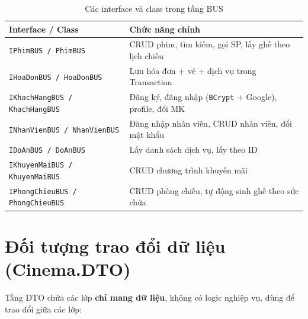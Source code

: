 \documentclass[12pt,a4paper,oneside]{book}
\theoremstyle{plain}
\numberwithin{equation}{chapter}
\begin{document}
\begin{table}[H]
    \begin{center}
        \begin{tabular}{|l|l|}
            \hline
            \textbf{Interface / Class} & \textbf{Chức năng chính} \\
            \hline
            \texttt{IPhimBUS / PhimBUS}               & CRUD phim, tìm kiếm, gọi SP, lấy ghế theo lịch chiếu \\
            \hline
            \texttt{IHoaDonBUS / HoaDonBUS}           & Lưu hóa đơn + vé + dịch vụ trong Transaction \\
            \hline
            \texttt{IKhachHangBUS / KhachHangBUS}     & Đăng ký, đăng nhập (\texttt{BCrypt} + Google), profile, đổi MK \\
            \hline
            \texttt{INhanVienBUS / NhanVienBUS}       & Đăng nhập nhân viên, CRUD nhân viên, đổi mật khẩu \\
            \hline
            \texttt{IDoAnBUS / DoAnBUS}               & Lấy danh sách dịch vụ, lấy theo ID \\
            \hline
            \texttt{IKhuyenMaiBUS / KhuyenMaiBUS}     & CRUD chương trình khuyến mãi \\
            \hline
            \texttt{IPhongChieuBUS / PhongChieuBUS}   & CRUD phòng chiếu, tự động sinh ghế theo sức chứa \\
            \hline
        \end{tabular}
    \end{center}
    \caption{Các interface và class trong tầng BUS}\label{table_bus}
\end{table}

\section{Đối tượng trao đổi dữ liệu (Cinema.DTO)}\label{Sec3.3}

\noindent Tầng DTO chứa các lớp \textbf{chỉ mang dữ liệu}, không có logic nghiệp vụ, dùng để trao đổi giữa các lớp:
\end{document}
